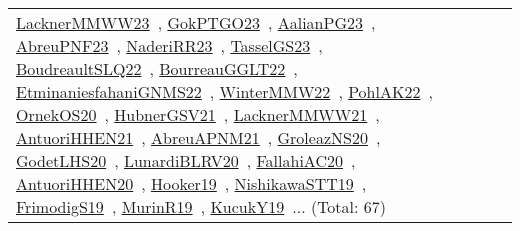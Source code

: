 {\begin{longtable}{lp{3cm}>{\raggedright\arraybackslash}p{6cm}>{\raggedright\arraybackslash}p{6cm}>{\raggedright\arraybackslash}p{8cm}}
\href{../works/LacknerMMWW23.pdf}{LacknerMMWW23}~\cite{LacknerMMWW23}, \href{../works/GokPTGO23.pdf}{GokPTGO23}~\cite{GokPTGO23}, \href{../works/AalianPG23.pdf}{AalianPG23}~\cite{AalianPG23}, \href{../works/AbreuPNF23.pdf}{AbreuPNF23}~\cite{AbreuPNF23}, \href{../works/NaderiRR23.pdf}{NaderiRR23}~\cite{NaderiRR23}, \href{../works/TasselGS23.pdf}{TasselGS23}~\cite{TasselGS23}, \href{../works/BoudreaultSLQ22.pdf}{BoudreaultSLQ22}~\cite{BoudreaultSLQ22}, \href{../works/BourreauGGLT22.pdf}{BourreauGGLT22}~\cite{BourreauGGLT22}, \href{../works/EtminaniesfahaniGNMS22.pdf}{EtminaniesfahaniGNMS22}~\cite{EtminaniesfahaniGNMS22}, \href{../works/WinterMMW22.pdf}{WinterMMW22}~\cite{WinterMMW22}, \href{../works/PohlAK22.pdf}{PohlAK22}~\cite{PohlAK22}, \href{../works/OrnekOS20.pdf}{OrnekOS20}~\cite{OrnekOS20}, \href{../works/HubnerGSV21.pdf}{HubnerGSV21}~\cite{HubnerGSV21}, \href{../works/LacknerMMWW21.pdf}{LacknerMMWW21}~\cite{LacknerMMWW21}, \href{../works/AntuoriHHEN21.pdf}{AntuoriHHEN21}~\cite{AntuoriHHEN21}, \href{../works/AbreuAPNM21.pdf}{AbreuAPNM21}~\cite{AbreuAPNM21}, \href{../works/GroleazNS20.pdf}{GroleazNS20}~\cite{GroleazNS20}, \href{../works/GodetLHS20.pdf}{GodetLHS20}~\cite{GodetLHS20}, \href{../works/LunardiBLRV20.pdf}{LunardiBLRV20}~\cite{LunardiBLRV20}, \href{../works/FallahiAC20.pdf}{FallahiAC20}~\cite{FallahiAC20}, \href{../works/AntuoriHHEN20.pdf}{AntuoriHHEN20}~\cite{AntuoriHHEN20}, \href{../works/Hooker19.pdf}{Hooker19}~\cite{Hooker19}, \href{../works/NishikawaSTT19.pdf}{NishikawaSTT19}~\cite{NishikawaSTT19}, \href{../works/FrimodigS19.pdf}{FrimodigS19}~\cite{FrimodigS19}, \href{../works/MurinR19.pdf}{MurinR19}~\cite{MurinR19}, \href{../works/KucukY19.pdf}{KucukY19}~\cite{KucukY19}... (Total: 67)\\

\end{longtable}}
